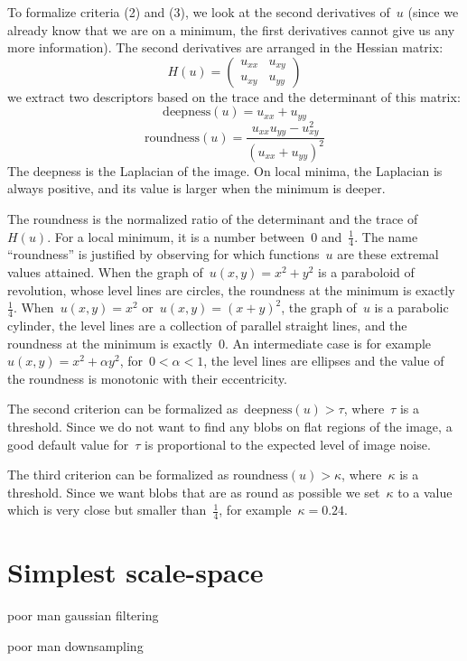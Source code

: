 \documentclass[a4paper]{article}
\begin{document}
To formalize criteria (2) and (3), we look at the second derivatives of~$u$
(since we already know that we are on a minimum, the first derivatives cannot
give us any more information).  The second derivatives are arranged in the
Hessian matrix:
\[
	H(u)=\begin{pmatrix}u_{xx} & u_{xy} \\ u_{xy} & u_{yy}\end{pmatrix}
\]
we extract two descriptors based on the trace and the determinant of this
matrix:
\[
	\mathrm{deepness}(u)=u_{xx}+u_{yy}
\]
\[
	\mathrm{roundness}(u)=\frac{u_{xx}u_{yy} - u_{xy}^2}{\left(u_{xx}+u_{yy} \right)^2}
\]
The deepness is the Laplacian of the image.  On local minima, the Laplacian is
always positive, and its value is larger when the minimum is deeper.

The roundness is the normalized ratio of the determinant and the trace
of~$H(u)$.  For a local minimum, it is a number between~$0$ and~$\frac{1}{4}$.
The name ``roundness'' is justified by observing for which functions~$u$ are
these extremal values attained.  When the graph of~$u(x,y)=x^2+y^2$ is a
paraboloid of revolution, whose level lines are circles, the roundness at the
minimum is exactly~$\frac{1}{4}$.  When~$u(x,y)=x^2$ or~$u(x,y)=(x+y)^2$, the
graph of~$u$ is a parabolic cylinder, the level lines are a collection of
parallel straight lines, and the roundness at the minimum is exactly~$0$.  An
intermediate case is for example~$u(x,y)=x^2+\alpha y^2$, for~$0 < \alpha < 1$,
the level lines are ellipses and the value of the roundness is monotonic with
their eccentricity.


The second criterion can be formalized as~$\mathrm{deepness}(u) > \tau$,
where~$\tau$ is a threshold.  Since we do not want to find any blobs on flat
regions of the image, a good default value for~$\tau$ is proportional to the
expected level of image noise.

The third criterion can be formalized as $\mathrm{roundness}(u) > \kappa$,
where~$\kappa$ is a threshold.  Since we want blobs that are as round as
possible we set~$\kappa$ to a value which is very close but smaller
than~$\frac{1}{4}$, for example~$\kappa=0.24$.


\section{Simplest scale-space}

poor man gaussian filtering

poor man downsampling
\end{document}

